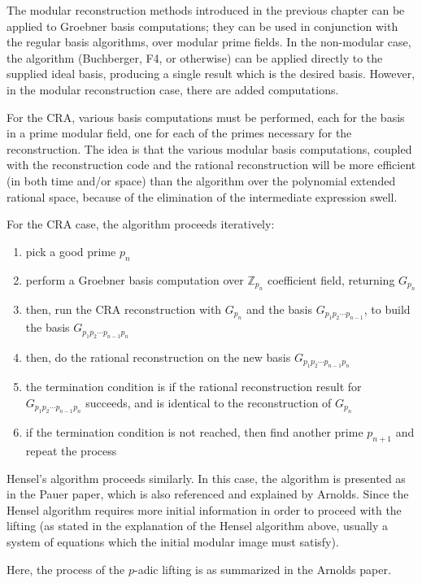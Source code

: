 \documentclass[letterpaper,12pt,titlepage,oneside,final]{book}
\begin{document}
The modular reconstruction methods introduced in the previous chapter can be applied to Groebner basis computations; they can be used in conjunction with the regular basis algorithms, over modular prime fields.  In the non-modular case, the algorithm (Buchberger, F4, or otherwise) can be applied directly to the supplied ideal basis, producing a single result which is the desired basis.  However, in the modular reconstruction case, there are added computations.  

For the CRA, various basis computations must be performed, each for the basis in a prime modular field, one for each of the primes necessary for the reconstruction.  The idea is that the various modular basis computations, coupled with the reconstruction code and the rational reconstruction will be more efficient (in both time and/or space) than the algorithm over the polynomial extended rational space, because of the elimination of the intermediate expression swell.  

For the CRA case, the algorithm proceeds iteratively:
\begin{enumerate}
  \item pick a good prime ${p_n}$
  \item perform a Groebner basis computation over ${\mathbb{Z}_{p_n}}$ coefficient field, returning ${G_{p_n}}$
  \item then, run the CRA reconstruction with ${G_{p_n}}$ and the basis ${G_{p_1p_2 \cdots p_{n-1}}}$, to build the basis ${G_{p_1p_2 \cdots p_{n-1}p_n}}$ 
  \item then, do the rational reconstruction on the new basis ${G_{p_1p_2 \cdots p_{n-1}p_n}}$ 
  \item the termination condition is if the rational reconstruction result for ${G_{p_1p_2 \cdots p_{n-1}p_n}}$ succeeds, and is identical to the reconstruction of ${G_{p_n}}$
  \item if the termination condition is not reached, then find another prime ${p_{n+1}}$ and repeat the process
\end{enumerate}

Hensel's algorithm proceeds similarly.  In this case, the algorithm is presented as in the Pauer paper, which is also referenced and explained by Arnolds.  Since the Hensel algorithm requires more initial information in order to proceed with the lifting (as stated in the explanation of the Hensel algorithm above, usually a system of equations which the initial modular image must satisfy).  

Here, the process of the ${p}$-adic lifting is as summarized in the Arnolds paper.  
\end{document}
